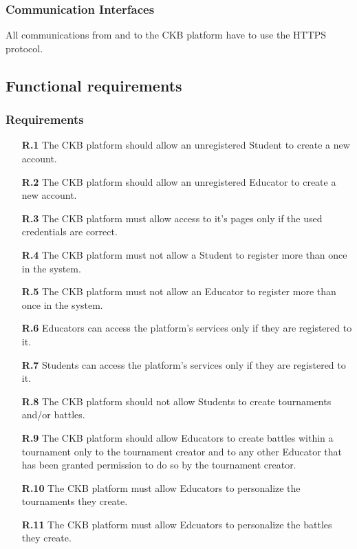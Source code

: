 \documentclass{article}
\begin{document}
{    \subsubsection{Communication Interfaces}
        All communications from and to the CKB platform have to use the HTTPS protocol.
\subsection{Functional requirements}
    \subsubsection{Requirements}
        \begin{itemize}
            
            \item[\textbf{R.1}] The CKB platform should allow an unregistered Student to create a new account.
            \item[\textbf{R.2}] The CKB platform should allow an unregistered Educator to create a new account.
            \item[\textbf{R.3}] The CKB platform must allow access to it's pages only if the used credentials are correct.                
            \item[\textbf{R.4}] The CKB platform must not allow a Student to register more than once in the system.
            \item[\textbf{R.5}] The CKB platform must not allow an Educator to register more than once in the system.
            \item[\textbf{R.6}] Educators can access the platform's services only if they are registered to it.
            \item[\textbf{R.7}] Students can access the platform's services only if they are registered to it.
            \item[\textbf{R.8}] The CKB platform should not allow Students to create tournaments and/or battles.
            \item[\textbf{R.9}] The CKB platform should allow Educators to create battles within a tournament only to the tournament
            creator and to any other Educator that has been granted permission to do so by the tournament creator.
            \item[\textbf{R.10}] The CKB platform must allow Educators to personalize the tournaments they create.
            \item[\textbf{R.11}] The CKB platform must allow Edcuators to personalize the battles they create.

\end{itemize}}
\end{document}

